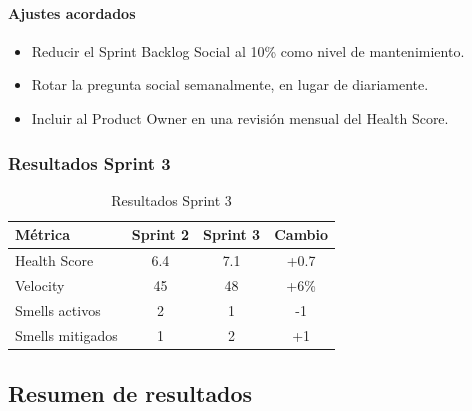 \paragraph{Ajustes acordados}
\begin{itemize}
    \item Reducir el Sprint Backlog Social al 10\% como nivel de mantenimiento.
    \item Rotar la pregunta social semanalmente, en lugar de diariamente.
    \item Incluir al Product Owner en una revisión mensual del Health Score.
\end{itemize}

\subsubsection{Resultados Sprint 3}

\begin{table}[h]
    \centering
    \small
    \begin{tabularx}{\textwidth}{|X|c|c|c|}
        \hline
        \textbf{Métrica} & \textbf{Sprint 2} & \textbf{Sprint 3} & \textbf{Cambio} \\
        \hline
        Health Score     & 6.4               & 7.1               & +0.7            \\
        \hline
        Velocity         & 45                & 48                & +6\%            \\
        \hline
        Smells activos   & 2                 & 1                 & -1              \\
        \hline
        Smells mitigados & 1                 & 2                 & +1              \\
        \hline
    \end{tabularx}
    \caption{Resultados Sprint 3}
    \label{tab:resultados-sprint3}
\end{table}
\FloatBarrier

\subsection{Resumen de resultados}

